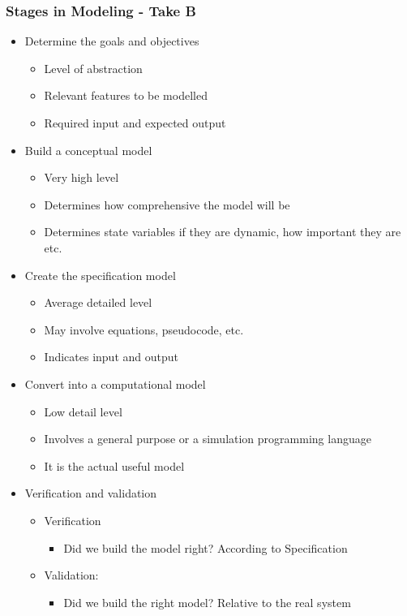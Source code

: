 \documentclass[a4paper]{article}
\begin{document}
	\subsubsection{Stages in Modeling - Take B}
	\begin{itemize}
		\item Determine the goals and objectives
		\begin{itemize}
			\item Level of abstraction
			\item Relevant features to be modelled
			\item Required input and expected output
		\end{itemize}
		\item Build a conceptual model
		\begin{itemize}
			\item Very high level
			\item Determines how comprehensive the model will be
			\item Determines state variables if they are dynamic,
				how important they are etc.
		\end{itemize}
		\item Create the specification model
		\begin{itemize}
			\item Average detailed level
			\item May involve equations, pseudocode, etc.
			\item Indicates input and output
		\end{itemize}
		\item Convert into a computational model
		\begin{itemize}
			\item Low detail level
			\item Involves a general purpose or a simulation
				programming language
			\item It is the actual useful model
		\end{itemize}
		\item Verification and validation
		\begin{itemize}
			\item Verification
			\begin{itemize}
				\item Did we build the model right? According to
					Specification
			\end{itemize}
			\item Validation:
			\begin{itemize}
				\item Did we build the right model? Relative to
					the real system
			\end{itemize}
		\end{itemize}
	\end{itemize}
\end{document}
